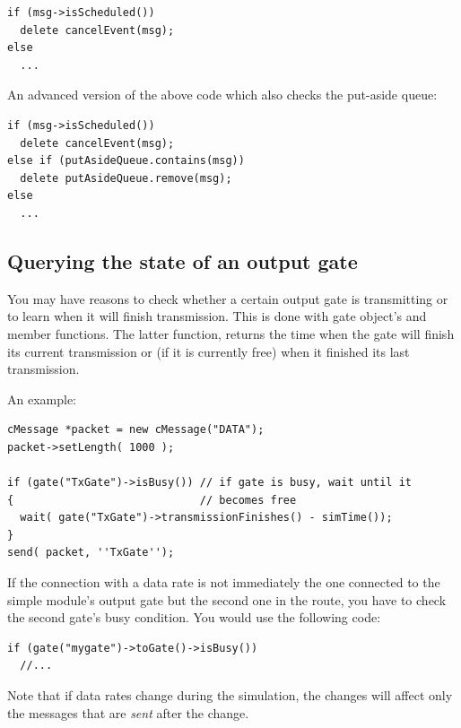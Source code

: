 \begin{verbatim}
if (msg->isScheduled())
  delete cancelEvent(msg);
else
  ...
\end{verbatim}

An advanced version of the above code which also checks the put-aside
queue:

\begin{verbatim}
if (msg->isScheduled())
  delete cancelEvent(msg);
else if (putAsideQueue.contains(msg))
  delete putAsideQueue.remove(msg);
else
  ...
\end{verbatim}




\subsection{Querying the state of an output gate}

You may have reasons to check whether a certain output gate is
transmitting or to learn when it will finish
transmission. This is done with gate
object's  and  member
functions.  The latter function,  returns the
time when the gate will finish its current transmission or (if it is
currently free) when it finished its last transmission.


An example:

\begin{verbatim}
cMessage *packet = new cMessage("DATA");
packet->setLength( 1000 );

if (gate("TxGate")->isBusy()) // if gate is busy, wait until it
{                             // becomes free
  wait( gate("TxGate")->transmissionFinishes() - simTime());
}
send( packet, ''TxGate'');
\end{verbatim}


If the connection with a data rate is not immediately the one
connected to the simple module's output gate but
the second one in the route, you have to check the second gate's busy
condition.  You would use the following code:

\begin{verbatim}
if (gate("mygate")->toGate()->isBusy())
  //...
\end{verbatim}


Note that if data rates change during the
simulation, the changes will affect only the messages that are
\textit{sent} after the change.



